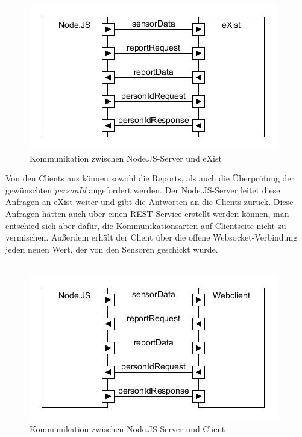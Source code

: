 \begin{figure}[h]
\begin{center}
\includegraphics[scale=0.8]{images/komm2.jpg} 
\caption{Kommunikation zwischen Node.JS-Server und eXist}
\end{center}
\end{figure}

Von den Clients aus können sowohl die Reports, als auch die Überprüfung der gewünschten \textit{personId} angefordert werden. Der Node.JS-Server leitet diese Anfragen an eXist weiter und gibt die Antworten an die Clients zurück. Diese Anfragen hätten auch über einen REST-Service erstellt werden können, man entschied sich aber dafür, die Kommunikationsarten auf Clientseite nicht zu vermischen. Außerdem erhält der Client über die offene Websocket-Verbindung jeden neuen Wert, der von den Sensoren geschickt wurde.  \\ \\

\begin{figure}[h]
\begin{center}
\includegraphics[scale=0.8]{images/komm3.jpg} 
\caption{Kommunikation zwischen Node.JS-Server und Client}
\end{center}
\end{figure}




